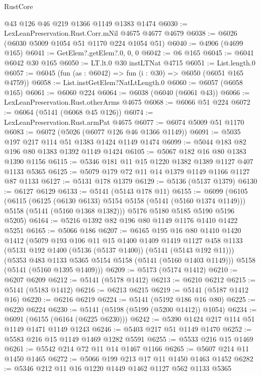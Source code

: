 \begin{lexlean}{RustCore}
\begin{coremodule}
    @43
    @126
    @46
    @219
    @1366
    @1149
    @1383
    @1474
@6030 := LexLeanPreservation.Rust.Corr.mNil @4675 @4677 @4679
@6038 := @6026 (@6030 @5009 @1054 @51 @1170 @224 @1054 @51)
@6040 := @4906 (@4699 @165)
@6041 := GetElem?.getElem?.{0, 0, 0}
@6042 := @6 @165
@6045 := @6041 @6042 @30 @165
@6050 := LT.lt.{0} @30 instLTNat @4715
@6051 := List.length.{0}
@6057 := @6045 (fun (as : @6042) => fun (i : @30) => @6050 (@6051 @165 @4759))
@6058 := List.instGetElem?NatLtLength.{0}
@6060 := @6057 (@6058 @165)
@6061 := @6060 @224
@6064 := @6038 (@6040 (@6061 @43))
@6066 := LexLeanPreservation.Rust.otherArms @4675
@6068 := @6066 @51 @224
@6072 := @6064 (@5141 (@6068 @45 @126))
@6074 := LexLeanPreservation.Rust.armPat @4675
@6077 := @6074 @5009 @51 @1170
@6083 := @6072 (@5026 (@6077 @126 @46 @1366 @1149))
@6091 := @5035 @197 @217 @114 @51 @1383 @1424 @1149 @1474
@6099 := @5044 @183 @82 @196 @80 @1383 @1392 @1149 @1424
@6105 := @5067 @182 @16 @80 @1383 @1390 @1156
@6115 := @5346 @181 @11 @15 @1220 @1382 @1389 @1127 @407 @1133 @5365
@6125 := @5079 @179 @72 @11 @14 @1379 @1149 @1166 @1127 @87 @1133
@6127 := @5131 @178 @1379
@6129 := @5136 (@5137 @1379)
@6130 := @6127 @6129
@6133 := @5141 (@5143 @178 @11)
@6155 := @6099
    (@6105
      (@6115
        (@6125 (@6130 @6133) @5154 @5158 (@5141 (@5160 @1374 @1149)))
        @5158
        (@5141 (@5160 @1368 @1382)))
      @5176
      @5180
      @5185
      @5190
      @5196
      @5205)
@6164 := @5216 @1392 @82 @196 @80 @1149 @1176 @1410 @1422 @5251
@6165 := @5066 @186
@6207 := @6165
    @195
    @16
    @80
    @1410
    @1420
    @1412
    (@5079
      @193
      @106
      @11
      @15
      @1400
      @1409
      @1419
      @1127
      @458
      @1133
      (@5131 @192 @1400 (@5136 (@5137 @1400)) (@5141 (@5143 @192 @11)))
      (@5353 @483 @1133 @5365 @5154 @5158 (@5141 (@5160 @1403 @1149)))
      @5158
      (@5141 (@5160 @1395 @1409)))
@6209 := @5173 (@5174 @1412)
@6210 := @6207 @6209
@6212 := @5141 (@5178 @1412)
@6213 := @6210 @6212
@6215 := @5141 (@5183 @1412)
@6216 := @6213 @6215
@6219 := @5141 (@5187 @1412 @16)
@6220 := @6216 @6219
@6224 := @5141 (@5192 @186 @16 @80)
@6225 := @6220 @6224
@6230 := @5141 (@5198 (@5199 (@5200 @1412)) @1054)
@6234 := @6091 (@6155 (@6164 (@6225 @6230)))
@6242 := @5390 @1424 @217 @114 @51 @1149 @1471 @1149 @1243
@6246 := @5403 @217 @51 @1149 @1470
@6252 := @5583 @216 @15 @1149 @1469 @1282 @5591
@6255 := @5533 @216 @15 @1469
@6261 := @5542 @214 @72 @11 @14 @1467 @1166
@6265 := @5607 @214 @11 @1450 @1465
@6272 := @5066 @199 @213 @17 @11 @1450 @1463 @1452
@6282 := @5346 @212 @11 @16 @1220 @1449 @1462 @1127 @562 @1133 @5365

\end{coremodule}
\end{lexlean}
